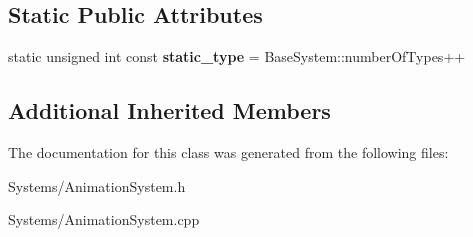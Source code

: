 \subsection*{Static Public Attributes}
\begin{DoxyCompactItemize}
\item 
\mbox{\label{classAnimationSystem_a288581c9524350d393f2a93e5aeb3165}} 
static unsigned int const {\bfseries static\+\_\+type} = Base\+System\+::number\+Of\+Types++
\end{DoxyCompactItemize}
\subsection*{Additional Inherited Members}


The documentation for this class was generated from the following files\+:\begin{DoxyCompactItemize}
\item 
Systems/Animation\+System.\+h\item 
Systems/Animation\+System.\+cpp\end{DoxyCompactItemize}

